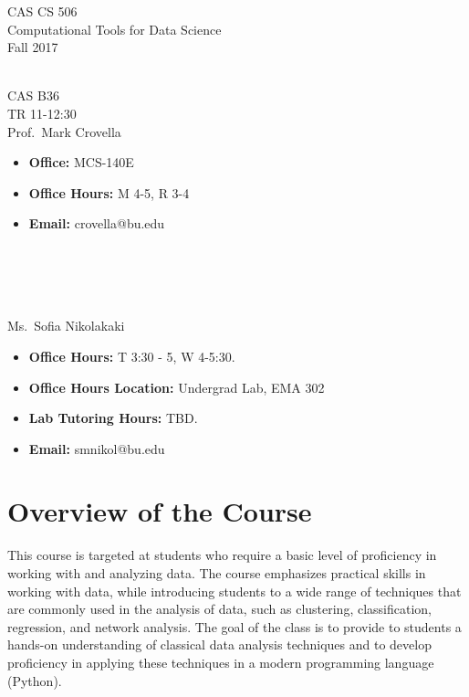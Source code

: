 \documentclass[11pt]{article}
\begin{document}
\sloppy 
\begin{center}
\LARGE CAS CS 506\\
\Large Computational Tools for Data Science\\
\Large\rm Fall 2017\\~\\
\end{center}

 CAS B36\\[\baselineskip]
 TR 11-12:30
\\[\baselineskip] 

 Prof.\ Mark Crovella\\[0.75\baselineskip]
\begin{minipage}[t]{0.60\textwidth}
\begin{itemize}
\item {\bf Office:} MCS-140E
\item {\bf Office Hours:} {\small M 4-5, R 3-4}
\item {\bf Email:} crovella@bu.edu
\end{itemize}
\end{minipage}
~\\~\\~\\~\\
  Ms.\ Sofia Nikolakaki\\[0.75\baselineskip]
 \begin{minipage}[t]{0.60\textwidth}
 \begin{itemize}
 \item {\bf Office Hours:} {\small T 3:30 - 5, W 4-5:30.}
 \item {\bf Office Hours Location:} Undergrad Lab, EMA 302
 \item {\bf Lab Tutoring Hours:} {\small TBD.}
 \item {\bf Email:} smnikol@bu.edu
 \end{itemize}
 \end{minipage}

\section*{Overview of the Course}

This course is targeted at students who require a basic level of
proficiency in working with and analyzing data.  The course emphasizes
practical skills in working with data, while introducing students to a
wide range of techniques that are commonly used in the analysis of data,
such as clustering, classification, regression, and network analysis.
The goal of the class is to provide to students a hands-on understanding
of classical data analysis techniques and to develop proficiency in
applying these techniques in a modern programming language (Python). 
\end{document}
